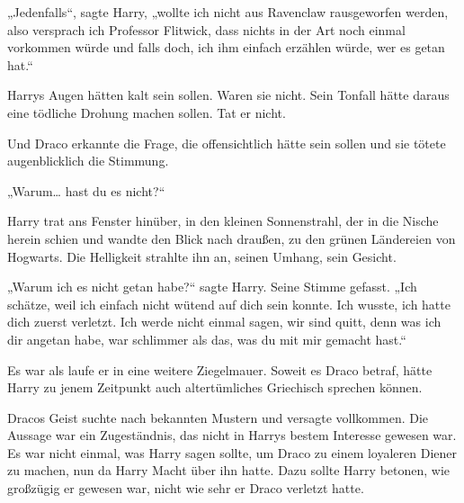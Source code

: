 „Jedenfalls“, sagte Harry, „wollte ich nicht aus Ravenclaw rausgeworfen werden, also versprach ich Professor Flitwick, dass nichts in der Art noch einmal vorkommen würde und falls doch, ich ihm einfach erzählen würde, wer es getan hat.“

Harrys Augen hätten kalt sein sollen. Waren sie nicht. Sein Tonfall hätte daraus eine tödliche Drohung machen sollen. Tat er nicht.

Und Draco erkannte die Frage, die offensichtlich hätte sein sollen und sie tötete augenblicklich die Stimmung.

„Warum… hast du es nicht?“

Harry trat ans Fenster hinüber, in den kleinen Sonnenstrahl, der in die Nische herein schien und wandte den Blick nach draußen, zu den grünen Ländereien von Hogwarts. Die Helligkeit strahlte ihn an, seinen Umhang, sein Gesicht.

„Warum ich es nicht getan habe?“ sagte Harry. Seine Stimme gefasst. „Ich schätze, weil ich einfach nicht wütend auf dich sein konnte. Ich wusste, ich hatte dich zuerst verletzt. Ich werde nicht einmal sagen, wir sind quitt, denn was ich dir angetan habe, war schlimmer als das, was du mit mir gemacht hast.“

Es war als laufe er in eine weitere Ziegelmauer. Soweit es Draco betraf, hätte Harry zu jenem Zeitpunkt auch altertümliches Griechisch sprechen können.

Dracos Geist suchte nach bekannten Mustern und versagte vollkommen. Die Aussage war ein Zugeständnis, das nicht in Harrys bestem Interesse gewesen war. Es war nicht einmal, was Harry sagen sollte, um Draco zu einem loyaleren Diener zu machen, nun da Harry Macht über ihn hatte. Dazu sollte Harry betonen, wie großzügig er gewesen war, nicht wie sehr er Draco verletzt hatte.

